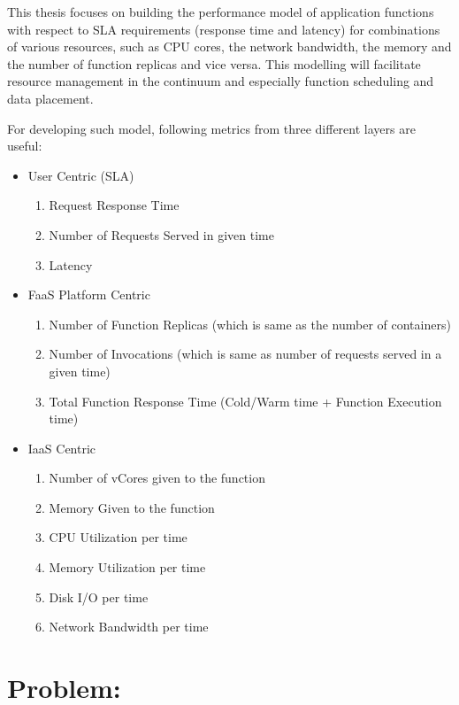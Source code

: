 This thesis focuses on building the performance model of application functions with respect to SLA requirements (response time and latency) for combinations of various resources, such as CPU cores, the network bandwidth, the memory and the number of function replicas and vice versa.
This modelling will facilitate resource management in the continuum and especially function scheduling and data placement.

\newpage

For developing such model, following metrics from three different layers are useful: 

\begin{itemize}
    \item User Centric (SLA)
        \begin{enumerate}
            \item Request Response Time
            \item Number of Requests Served in given time
            \item Latency
        \end{enumerate}
    \item FaaS Platform Centric
        \begin{enumerate}
            \item Number of Function Replicas (which is same as the number of containers)
            \item Number of Invocations (which is same as number of requests served in a given time)
            \item Total Function Response Time (Cold/Warm time + Function Execution time)
        \end{enumerate}
    \item IaaS Centric
        \begin{enumerate}
            \item Number of vCores given to the function
            \item Memory Given to the function
            \item CPU Utilization per time
            \item Memory Utilization per time
            \item Disk I/O per time
            \item Network Bandwidth per time
        \end{enumerate}
\end{itemize}

\section{Problem:}

